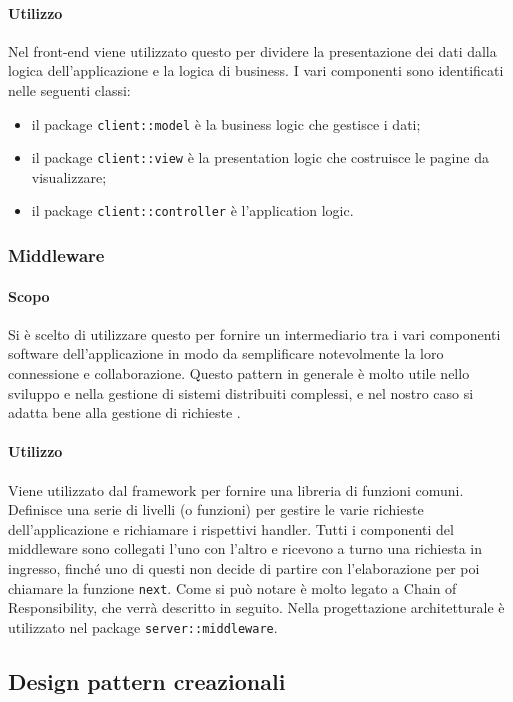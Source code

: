 \documentclass[12pt,a4paper]{article}
\begin{document}
\paragraph{Utilizzo}
Nel front-end viene utilizzato questo  per dividere la presentazione dei dati dalla logica dell'applicazione e la logica di business. I vari componenti sono identificati nelle seguenti classi:

\begin{itemize}
	\item il package \texttt{client::model} è la business logic che gestisce i dati;
	\item il package \texttt{client::view} è la presentation logic che costruisce le pagine da visualizzare;
	\item il package \texttt{client::controller} è l'application logic.
\end{itemize}

\subsubsection{Middleware}
\paragraph{Scopo}
Si è scelto di utilizzare questo  per fornire un intermediario tra i vari componenti software dell’applicazione in modo da semplificare notevolmente la loro connessione e collaborazione. Questo pattern in generale è molto utile nello sviluppo e nella gestione di sistemi distribuiti complessi, e nel nostro caso si adatta bene alla gestione di richieste .
\paragraph{Utilizzo}
Viene utilizzato dal framework  per fornire una libreria di funzioni comuni. Definisce una serie di livelli (o funzioni) per gestire le varie richieste dell’applicazione e richiamare i rispettivi handler. Tutti i componenti del middleware sono collegati l’uno con l’altro e ricevono a turno una richiesta in ingresso, finché uno di questi non decide di partire con l’elaborazione per poi chiamare la funzione \texttt{next}. Come si può notare è molto legato a Chain of Responsibility, che verrà descritto in seguito. Nella progettazione architetturale è utilizzato nel package \texttt{server::middleware}.

\subsection{Design pattern creazionali}
\end{document}
